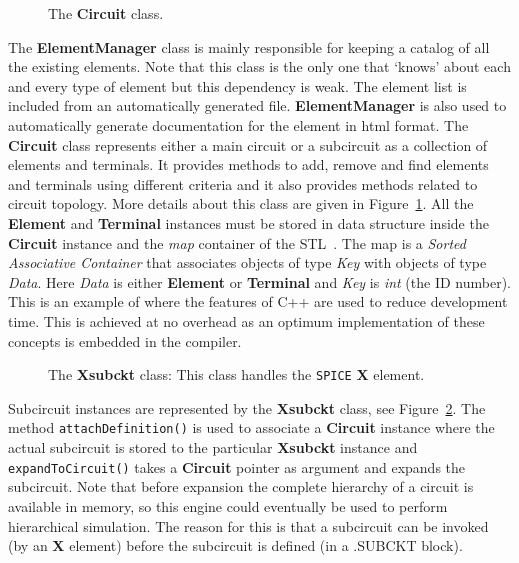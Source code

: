 %
%
%
\begin{figure}[htpb]
\centerline{\epsfxsize=6cm } \caption{The
{\bf Circuit} class.} \label{fig:circuitclass}
\end{figure}
%
The {\bf ElementManager} class is mainly responsible for keeping a
catalog of all the existing elements. Note that this class is the only
one that `knows' about each and every type of element but this
dependency is weak.  The element list is included from an
automatically generated file. {\bf ElementManager} is also used to
automatically generate documentation for the element in html format.
The {\bf Circuit} class
represents either a main circuit or a subcircuit as a collection of
elements and terminals. It provides methods to add, remove and find
elements and terminals using different criteria and it also provides
methods related to circuit topology. More details about this class are
given in Figure~\ref{fig:circuitclass}.  All the {\bf Element} and
{\bf Terminal} instances must be stored in data structure inside the
{\bf Circuit} instance and the \emph{map} container of the
STL~\cite{STL}. The map is a \emph{Sorted Associative Container} that
associates objects of type \emph{Key} with objects of type
\emph{Data}. Here \emph{Data} is either {\bf Element} or {\bf
Terminal} and \emph{Key} is \emph{int} (the ID number). This is an
example of where the features of C++ are used to reduce development
time. This is achieved at no overhead as an optimum implementation of
these concepts is embedded in the compiler.
%
\begin{figure}[htpb]
\centerline{\epsfxsize=6cm } \caption{The
{\bf Xsubckt} class: This class handles the \texttt{SPICE} {\bf X} element.}
\label{fig:xsubcktclass}
\end{figure}
%
Subcircuit instances are represented by the {\bf Xsubckt} class, see
Figure~\ref{fig:xsubcktclass}.  The method {\tt attachDefinition()} is
used to associate a {\bf Circuit} instance where the actual subcircuit
is stored to the particular {\bf Xsubckt} instance and {\tt
expandToCircuit()} takes a {\bf Circuit} pointer as argument and
expands the subcircuit.
Note that before expansion the complete hierarchy of a circuit is
available in memory, so this engine could eventually be used to
perform hierarchical simulation. The reason for this is that a subcircuit
can be invoked (by an {\bf X} element) before the subcircuit is defined
(in a .SUBCKT block).

